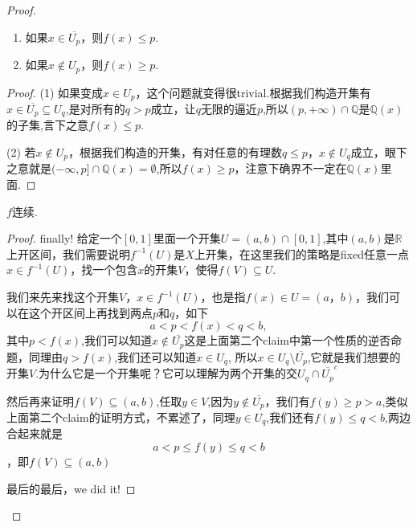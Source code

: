 \begin{proof}
\begin{claim}
\begin{enumerate}
	\item 如果$x \in \overline{U_p}$，则$f(x) \leq p$.
	\item 如果$x \notin U_p$，则$f(x) \geq p$.
\end{enumerate}
\end{claim}

\begin{proof}
(1) 如果变成$x \in {U_p}$，这个问题就变得很trivial.根据我们构造开集有$x \in \overline{U_p} \subseteq {U_q}$,是对所有的$q > p$成立，让$q$无限的逼近$p$,所以$(p,+\infty) \cap \mathbb{Q}$是$\mathbb{Q}(x)$的子集,言下之意$f(x) \leq p$.

(2) 若$x \notin U_p$，根据我们构造的开集，有对任意的有理数$q \leq p$，$x \notin U_q$成立，眼下之意就是$(-\infty,p] \cap \mathbb{Q}(x) = \emptyset$,所以$f(x) \geq p$，注意下确界不一定在$\mathbb{Q}(x)$里面.
\end{proof}

\begin{claim}
$f$连续.
\end{claim}

\begin{proof}
finally! 给定一个$[0,1]$里面一个开集$U=(a,b) \cap [0,1]$,其中$(a,b)$是$\mathbb{R}$上开区间，我们需要说明$f^{-1}(U)$是$X$上开集，在这里我们的策略是fixed任意一点$x \in f^{-1}(U)$，找一个包含$x$的开集$V$，使得$f(V) \subseteq U$. 

我们来先来找这个开集$V$，$x \in f^{-1}(U)$，也是指$f(x) \in U=(a，b)$，我们可以在这个开区间上再找到两点$p$和$q$，如下\[a < p < f(x) < q < b,\]其中$p < f(x)$,我们可以知道$x \notin \overline{U_p}$这是上面第二个claim中第一个性质的逆否命题，同理由$q > f(x)$,我们还可以知道$x \in U_q$, 所以$x \in U_q \setminus \overline{U_p}$,它就是我们想要的开集$V$.为什么它是一个开集呢？它可以理解为两个开集的交$U_q \cap \overline{U_p}^c$

然后再来证明$f(V) \subseteq (a,b)$,任取$y \in V$,因为$y \notin \overline{U_p}$，我们有$f(y) \geq p > a$,类似上面第二个claim的证明方式，不累述了，同理$ y \in U_q$,我们还有$f(y) \leq q < b$,两边合起来就是\[  a < p \leq f(y) \leq q < b\]，即$f(V) \subseteq (a,b)$

最后的最后，we did it!
\end{proof}

\end{proof}

